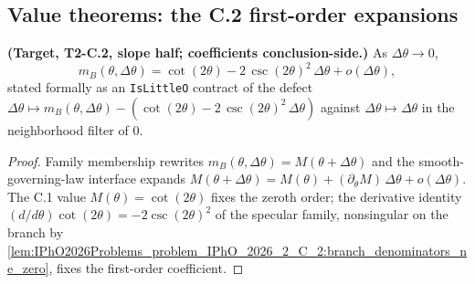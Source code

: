 \subsection*{Value theorems: the C.2 first-order expansions}

\begin{theorem}
\label{thm:IPhO2026Problems_problem_IPhO_2026_2_C_2:ray_B_slope_first_order}
\textbf{(Target, T2-C.2, slope half; coefficients conclusion-side.)}  As
$\Delta\theta \to 0$,
\[
m_B(\theta, \Delta\theta)
= \cot (2\theta) - 2\,\csc(2\theta)^{2}\,\Delta\theta + o(\Delta\theta) ,
\]
stated formally as an \texttt{IsLittleO} contract of the defect
$\Delta\theta \mapsto m_B(\theta,\Delta\theta) -
(\cot(2\theta) - 2\,\csc(2\theta)^2\,\Delta\theta)$ against
$\Delta\theta \mapsto \Delta\theta$ in the neighborhood filter of $0$.
\end{theorem}
\begin{proof}
Family membership rewrites $m_B(\theta,\Delta\theta) = M(\theta+\Delta\theta)$
and the smooth-governing-law interface expands
$M(\theta+\Delta\theta) = M(\theta) + (\partial_\theta M)\,\Delta\theta
+ o(\Delta\theta)$.  The C.1 value $M(\theta) = \cot(2\theta)$ fixes the
zeroth order; the derivative identity
$(d/d\theta)\cot(2\theta) = -2\csc(2\theta)^2$ of the specular family,
nonsingular on the branch by
\cref{lem:IPhO2026Problems_problem_IPhO_2026_2_C_2:branch_denominators_ne_zero},
fixes the first-order coefficient.
\end{proof}

